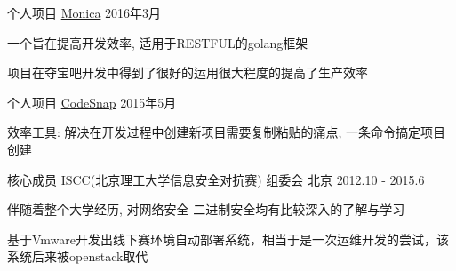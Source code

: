 

\begin{cventries}

  \cventry
    {个人项目} %
    {\href{https://github.com/DrWrong/monica}{Monica}} %
    {} %
    {2016年3月} %
    {
      \begin{cvitems} %
      \item {一个旨在提高开发效率, 适用于RESTFUL的golang框架}
      \item {项目在夺宝吧开发中得到了很好的运用很大程度的提高了生产效率}
      \end{cvitems}
    }

  \cventry
    {个人项目} %
    {\href{https://github.com/DrWrong/code_snap}{CodeSnap}} %
    {} %
    {2015年5月} %
    {
      \begin{cvitems} %
        \item {效率工具: 解决在开发过程中创建新项目需要复制粘贴的痛点, 一条命令搞定项目创建}
      \end{cvitems}
    }

  \cventry
    {核心成员} %
    {ISCC(北京理工大学信息安全对抗赛) 组委会} %
    {北京} %
    {2012.10 - 2015.6} %
    {
      \begin{cvitems} %
      \item {伴随着整个大学经历, 对网络安全 二进制安全均有比较深入的了解与学习}
        \item {基于Vmware开发出线下赛环境自动部署系统，相当于是一次运维开发的尝试，该系统后来被openstack取代}
      \end{cvitems}
    }


\end{cventries}

